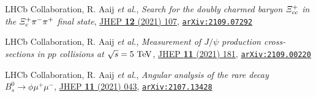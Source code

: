 \documentclass[a4paper, 11pt]{article}
\newenvironment{cvcontent}{
  \leftskip=0.5cm\rightskip=0cm
  \noindent\ignorespaces}{\par}
\newcommand{\arxiv}[1]{\href{https://arxiv.org/abs/#1}{\texttt{arXiv:#1}}}
\begin{document}
\begin{cvcontent}
\begin{enumerate}[label={[\arabic*]}, leftmargin=1.5cm]
    \item LHCb Collaboration, R. Aaij \emph{et al.}, 
    \emph{Search for the doubly charmed baryon $\it{\Xi}_{cc}^{+}$ in the $\it{\Xi}_{c}^{+} \pi^{-} \pi^{+}$ final state},
    \href{https://doi.org/10.1007/JHEP12(2021)107}{JHEP \textbf{12} (2021) 107},
    \arxiv{2109.07292}
    \item LHCb Collaboration, R. Aaij \emph{et al.}, 
    \emph{Measurement of $J/\psi$ production cross-sections in $pp$ collisions at $\sqrt{s}=5~\rm{TeV}$},
    \href{http://dx.doi.org/10.1007/JHEP11(2021)181}{JHEP \textbf{11} (2021) 181},
    \arxiv{2109.00220}
    \sloppy
    \item LHCb Collaboration, R. Aaij \emph{et al.}, 
    \emph{Angular analysis of the rare decay $B_s^0 \to \phi \mu^+ \mu^-$},
    \href{http://dx.doi.org/10.1007/JHEP11(2021)043}{JHEP \textbf{11} (2021) 043},
    \arxiv{2107.13428}
  \end{enumerate}
\end{cvcontent}
\end{document}
